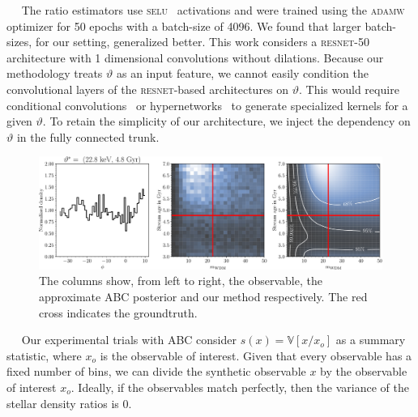 \documentclass{article}
\begin{document}
~~
The ratio estimators
use \textsc{selu}~\citep{selu} activations and were trained using the \textsc{adamw}~\citep{adamw} optimizer for 50 epochs
with a batch-size of 4096. We found that larger batch-sizes, for our setting, generalized better.
This work considers a \textsc{resnet-50}~\citep{resnet} architecture with
1 dimensional convolutions without dilations.
Because our methodology treats $\vartheta$ as an input feature, we cannot easily
condition the convolutional layers of the \textsc{resnet}-based architectures on $\vartheta$.
This would require conditional convolutions~\citep{yang2019condconv} or hypernetworks~\citep{ha2016hypernetworks} to generate specialized kernels for a given $\vartheta$.
To retain the simplicity of our architecture, we inject the dependency on
$\vartheta$ in the fully connected trunk.
\begin{figure}
    \centering
    \includegraphics[width=.8\linewidth]{figures/abc-results-compact-combined-horizontal}
    \caption{The columns show, from left to right,
    the observable, the approximate ABC posterior and our method respectively. The red cross indicates the groundtruth.
    ~~\protect{}}
    \label{fig:abc_results_compact}
\end{figure}

~~
Our experimental trials with ABC consider
$s(x) = \mathbb{V}\left[x / x_o\right]$
as a summary statistic, where $x_o$ is the observable of interest.
Given that every observable has a fixed number of bins, we can divide the synthetic observable $x$
by the observable of interest $x_o$. Ideally, if the observables match perfectly, then the
variance of the stellar density ratios is 0.
\end{document}
